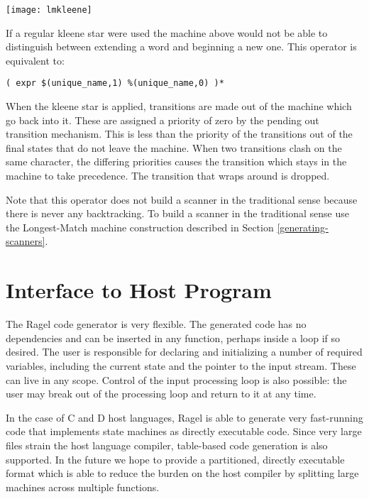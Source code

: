\documentclass[letterpaper,11pt,oneside]{book}
\newcommand{\verbspace}{\vspace{10pt}}
\newcommand{\graphspace}{\vspace{10pt}}
\begin{document}
\begin{center}
\texttt{[image: lmkleene]}
\end{center}
\graphspace

If a regular kleene star were used the machine above would not be able to
distinguish between extending a word and beginning a new one.  This operator is
equivalent to:

\verbspace
\begin{verbatim}
( expr $(unique_name,1) %(unique_name,0) )*
\end{verbatim}
\verbspace

When the kleene star is applied, transitions are made out of the machine which
go back into it. These are assigned a priority of zero by the pending out
transition mechanism. This is less than the priority of the transitions out of
the final states that do not leave the machine. When two transitions clash on
the same character, the differing priorities causes the transition which
stays in the machine to take precedence.  The transition that wraps around is
dropped.

Note that this operator does not build a scanner in the traditional sense
because there is never any backtracking. To build a scanner in the traditional
sense use the Longest-Match machine construction described in Section
\ref{generating-scanners}.

\chapter{Interface to Host Program}

The Ragel code generator is very flexible. The generated code has no
dependencies and can be inserted in any function, perhaps inside a loop if so
desired.  The user is responsible for declaring and initializing a number of
required variables, including the current state and the pointer to the input
stream. These can live in any scope. Control of the input processing loop is
also possible: the user may break out of the processing loop and return to it
at any time.

In the case of C and D host languages, Ragel is able to generate very
fast-running code that implements state machines as directly executable code.
Since very large files strain the host language compiler, table-based code
generation is also supported. In the future we hope to provide a partitioned,
directly executable format which is able to reduce the burden on the host
compiler by splitting large machines across multiple functions.
\end{document}
